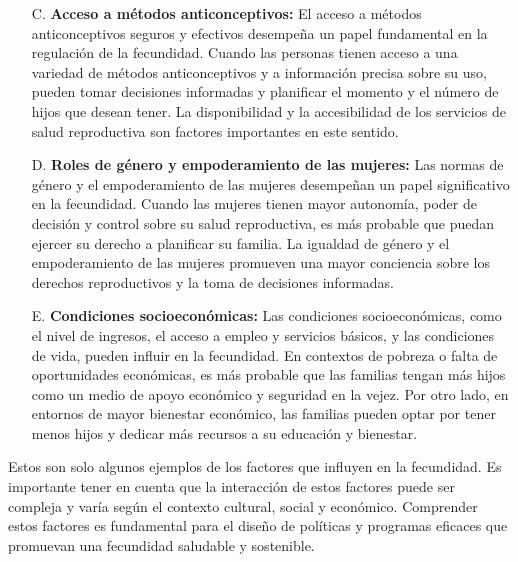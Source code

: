 \documentclass[8pt,a4paper]{beamer}
\begin{document}
{\begin{frame}{}
\setlength{\parskip}{3px}
\justifying
\begin{enumerate}
\setlength{\parskip}{3px}
\justifying
\item[C.] \textbf{Acceso a métodos anticonceptivos:} El acceso a métodos anticonceptivos seguros y efectivos desempeña un papel fundamental en la regulación de la fecundidad. Cuando las personas tienen acceso a una variedad de métodos anticonceptivos y a información precisa sobre su uso, pueden tomar decisiones informadas y planificar el momento y el número de hijos que desean tener. La disponibilidad y la accesibilidad de los servicios de salud reproductiva son factores importantes en este sentido.

\item[D.] \textbf{Roles de género y empoderamiento de las mujeres: }Las normas de género y el empoderamiento de las mujeres desempeñan un papel significativo en la fecundidad. Cuando las mujeres tienen mayor autonomía, poder de decisión y control sobre su salud reproductiva, es más probable que puedan ejercer su derecho a planificar su familia. La igualdad de género y el empoderamiento de las mujeres promueven una mayor conciencia sobre los derechos reproductivos y la toma de decisiones informadas.

\end{enumerate}

\end{frame}


\begin{frame}{}
\setlength{\parskip}{3px}
\justifying
\begin{enumerate}
\setlength{\parskip}{3px}
\justifying
\item[E.] \textbf{Condiciones socioeconómicas:} Las condiciones socioeconómicas, como el nivel de ingresos, el acceso a empleo y servicios básicos, y las condiciones de vida, pueden influir en la fecundidad. En contextos de pobreza o falta de oportunidades económicas, es más probable que las familias tengan más hijos como un medio de apoyo económico y seguridad en la vejez. Por otro lado, en entornos de mayor bienestar económico, las familias pueden optar por tener menos hijos y dedicar más recursos a su educación y bienestar.
\end{enumerate}
Estos son solo algunos ejemplos de los factores que influyen en la fecundidad. Es importante tener en cuenta que la interacción de estos factores puede ser compleja y varía según el contexto cultural, social y económico. Comprender estos factores es fundamental para el diseño de políticas y programas eficaces que promuevan una fecundidad saludable y sostenible.
\end{frame}

}
\end{document}
